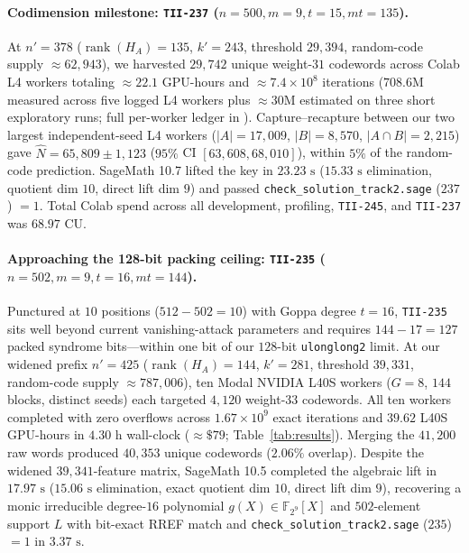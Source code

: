 \documentclass[11pt,a4paper]{article}
\begin{document}
\paragraph{Codimension milestone: \texttt{TII-237} ($n=500, m=9, t=15, mt=135$).}
At $n'=378$ ($\operatorname{rank}(H_A)=135$, $k'=243$, threshold $29{,}394$, random-code supply $\approx 62{,}943$), we harvested $29{,}742$ unique weight-$31$ codewords across Colab L4 workers totaling $\approx 22.1$ GPU-hours and $\approx 7.4 \times 10^8$ iterations ($708.6\text{M}$ measured across five logged L4 workers plus $\approx 30\text{M}$ estimated on three short exploratory runs; full per-worker ledger in ). Capture--recapture between our two largest independent-seed L4 workers ($|A|=17{,}009$, $|B|=8{,}570$, $|A \cap B|=2{,}215$) gave $\hat{N} = 65{,}809 \pm 1{,}123$ ($95\%$ CI $[63{,}608, 68{,}010]$), within $5\%$ of the random-code prediction. SageMath 10.7 lifted the key in $23.23\text{ s}$ ($15.33\text{ s}$ elimination, quotient dim $10$, direct lift dim $9$) and passed \texttt{check\_solution\_track2.sage} ($237$) $= 1$. Total Colab spend across all development, profiling, \texttt{TII-245}, and \texttt{TII-237} was $68.97\text{ CU}$.

\paragraph{Approaching the 128-bit packing ceiling: \texttt{TII-235} ($n=502, m=9, t=16, mt=144$).}
Punctured at $10$ positions ($512 - 502 = 10$) with Goppa degree $t=16$, \texttt{TII-235} sits well beyond current vanishing-attack parameters and requires $144 - 17 = 127$ packed syndrome bits---within one bit of our $128$-bit \texttt{ulonglong2} limit. At our widened prefix $n'=425$ ($\operatorname{rank}(H_A)=144$, $k'=281$, threshold $39{,}331$, random-code supply $\approx 787{,}006$), ten Modal NVIDIA L40S workers ($G=8$, $144$ blocks, distinct seeds) each targeted $4{,}120$ weight-$33$ codewords. All ten workers completed with zero overflows across $1.67 \times 10^9$ exact iterations and $39.62$ L40S GPU-hours in $4.30\text{ h}$ wall-clock ($\approx\$79$; Table~\ref{tab:results}). Merging the $41{,}200$ raw words produced $40{,}353$ unique codewords ($2.06\%$ overlap). Despite the widened $39{,}341$-feature matrix, SageMath 10.5 completed the algebraic lift in $17.97\text{ s}$ ($15.06\text{ s}$ elimination, exact quotient dim $10$, direct lift dim $9$), recovering a monic irreducible degree-$16$ polynomial $g(X) \in \mathbb{F}_{2^9}[X]$ and $502$-element support $L$ with bit-exact RREF match and \texttt{check\_solution\_track2.sage} ($235$) $= 1$ in $3.37\text{ s}$.
\end{document}

